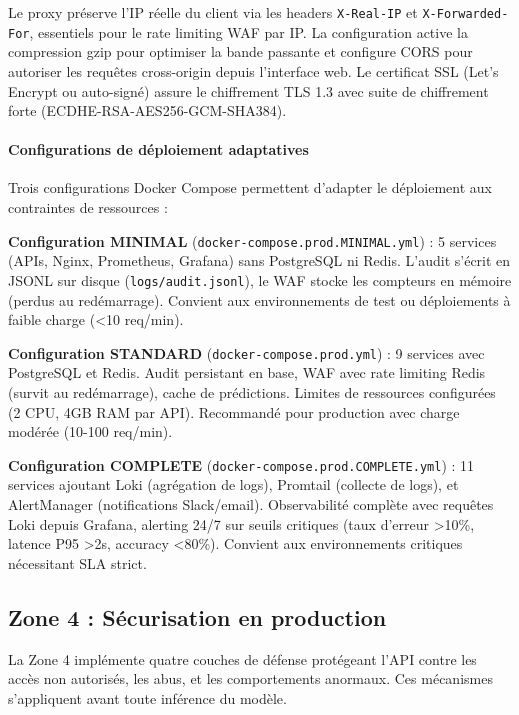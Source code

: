 Le proxy préserve l'IP réelle du client via les headers \texttt{X-Real-IP} et \texttt{X-Forwarded-For}, essentiels pour le rate limiting WAF par IP. La configuration active la compression gzip pour optimiser la bande passante et configure CORS pour autoriser les requêtes cross-origin depuis l'interface web. Le certificat SSL (Let's Encrypt ou auto-signé) assure le chiffrement TLS 1.3 avec suite de chiffrement forte (ECDHE-RSA-AES256-GCM-SHA384).

\paragraph{Configurations de déploiement adaptatives}

Trois configurations Docker Compose permettent d'adapter le déploiement aux contraintes de ressources :

\textbf{Configuration MINIMAL} (\texttt{docker-compose.prod.MINIMAL.yml}) : 5 services (APIs, Nginx, Prometheus, Grafana) sans PostgreSQL ni Redis. L'audit s'écrit en JSONL sur disque (\texttt{logs/audit.jsonl}), le WAF stocke les compteurs en mémoire (perdus au redémarrage). Convient aux environnements de test ou déploiements à faible charge (<10 req/min).

\textbf{Configuration STANDARD} (\texttt{docker-compose.prod.yml}) : 9 services avec PostgreSQL et Redis. Audit persistant en base, WAF avec rate limiting Redis (survit au redémarrage), cache de prédictions. Limites de ressources configurées (2 CPU, 4GB RAM par API). Recommandé pour production avec charge modérée (10-100 req/min).

\textbf{Configuration COMPLETE} (\texttt{docker-compose.prod.COMPLETE.yml}) : 11 services ajoutant Loki (agrégation de logs), Promtail (collecte de logs), et AlertManager (notifications Slack/email). Observabilité complète avec requêtes Loki depuis Grafana, alerting 24/7 sur seuils critiques (taux d'erreur >10\%, latence P95 >2s, accuracy <80\%). Convient aux environnements critiques nécessitant SLA strict.


\subsection{Zone 4 : Sécurisation en production}

La Zone 4 implémente quatre couches de défense protégeant l'API contre les accès non autorisés, les abus, et les comportements anormaux. Ces mécanismes s'appliquent avant toute inférence du modèle.

